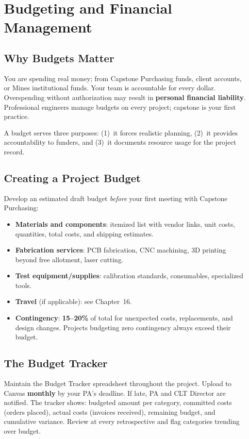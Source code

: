 \chapter{Budgeting and Financial Management}

\section{Why Budgets Matter}
You are spending real money; from Capstone Purchasing funds, client accounts, or Mines institutional funds. Your team is accountable for every dollar. Overspending without authorization may result in \textbf{personal financial liability}. Professional engineers manage budgets on every project; capstone is your first practice.

A budget serves three purposes: (1)~it forces realistic planning, (2)~it provides accountability to funders, and (3)~it documents resource usage for the project record.

\section{Creating a Project Budget}
Develop an estimated draft budget \emph{before} your first meeting with Capstone Purchasing:
\begin{itemize}[nosep,leftmargin=1.5em]
\item \textbf{Materials and components}: itemized list with vendor links, unit costs, quantities, total costs, and shipping estimates.
\item \textbf{Fabrication services}: PCB fabrication, CNC machining, 3D printing beyond free allotment, laser cutting.
\item \textbf{Test equipment/supplies}: calibration standards, consumables, specialized tools.
\item \textbf{Travel} (if applicable): see Chapter~16.
\item \textbf{Contingency}: \textbf{15--20\%} of total for unexpected costs, replacements, and design changes. Projects budgeting zero contingency always exceed their budget.
\end{itemize}

\section{The Budget Tracker}
Maintain the Budget Tracker spreadsheet throughout the project. Upload to Canvas \textbf{monthly} by your PA's deadline. If late, PA and CLT Director are notified. The tracker shows: budgeted amount per category, committed costs (orders placed), actual costs (invoices received), remaining budget, and cumulative variance. Review at every retrospective and flag categories trending over budget.

